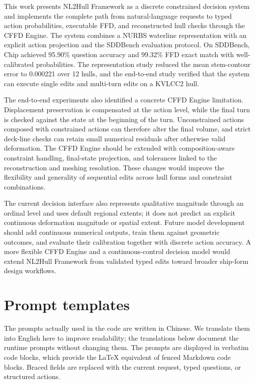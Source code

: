 \documentclass[a4paper,fleqn]{cas-dc}
\begin{document}
This work presents NL2Hull Framework as a discrete constrained decision system
and implements the complete path from natural-language requests to typed action
probabilities, executable FFD, and reconstructed hull checks through the CFFD
Engine. The system combines a NURBS waterline representation with an explicit
action projection and the SDDBench evaluation protocol. On SDDBench, Chip achieved 95.90\% question accuracy and 99.32\% FFD exact
match with well-calibrated probabilities. The representation study reduced the mean
stem-contour error to 0.000221 over 12 hulls, and the end-to-end study verified
that the system can execute single edits and multi-turn edits on a KVLCC2 hull.

The end-to-end experiments also identified a concrete CFFD Engine limitation.
Displacement preservation is compensated at the action level, while the final
turn is checked against the state at the beginning of the turn. Unconstrained
actions composed with constrained actions can therefore alter the final volume,
and strict deck-line checks can retain small numerical residuals after otherwise
valid deformation. The CFFD Engine should be extended with composition-aware
constraint handling, final-state projection, and tolerances linked to the
reconstruction and meshing resolution. These changes would improve the
flexibility and generality of sequential edits across hull forms and constraint
combinations.

The current decision interface also represents qualitative magnitude through an
ordinal level and uses default regional extents; it does not predict an explicit
continuous deformation magnitude or spatial extent. Future model development
should add continuous numerical outputs, train them against geometric outcomes,
and evaluate their calibration together with discrete action accuracy. A more
flexible CFFD Engine and a continuous-control decision model would extend
NL2Hull Framework from validated typed edits toward broader ship-form design
workflows.

\clearpage
\onecolumn
\appendix

\section{Prompt templates}
\label{app:prompts}

The prompts actually used in the code are written in Chinese. We translate them
into English here to improve readability; the translations below document the
runtime prompts without changing them. The prompts are displayed in verbatim code
blocks, which provide the LaTeX equivalent of fenced Markdown code blocks. Braced
fields are replaced with the current request, typed questions, or structured
actions.
\end{document}
